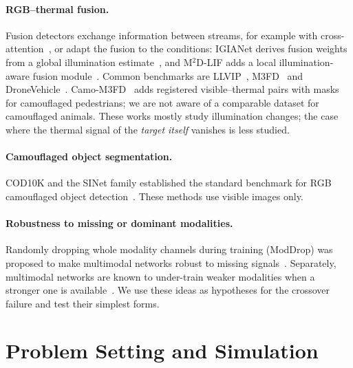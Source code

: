 \documentclass[runningheads]{llncs}
\begin{document}
\paragraph{RGB--thermal fusion.}
Fusion detectors exchange information between streams, for example with cross-attention~\cite{cft}, or adapt the fusion to the conditions: IGIANet derives fusion weights from a global illumination estimate~\cite{igianet}, and M$^2$D-LIF adds a local illumination-aware fusion module~\cite{m2dlif}. Common benchmarks are LLVIP~\cite{llvip}, M3FD~\cite{tardal} and DroneVehicle~\cite{dronevehicle}. Camo-M3FD~\cite{camom3fd} adds registered visible--thermal pairs with masks for camouflaged pedestrians; we are not aware of a comparable dataset for camouflaged animals. These works mostly study illumination changes; the case where the thermal signal of the \emph{target itself} vanishes is less studied.

\paragraph{Camouflaged object segmentation.}
COD10K and the SINet family established the standard benchmark for RGB camouflaged object detection~\cite{sinet,sinetv2}. These methods use visible images only.

\paragraph{Robustness to missing or dominant modalities.}
Randomly dropping whole modality channels during training (ModDrop) was proposed to make multimodal networks robust to missing signals~\cite{moddrop}. Separately, multimodal networks are known to under-train weaker modalities when a stronger one is available~\cite{wang2020,peng2022}. We use these ideas as hypotheses for the crossover failure and test their simplest forms.

\section{Problem Setting and Simulation}\label{sec:sim}
\end{document}

